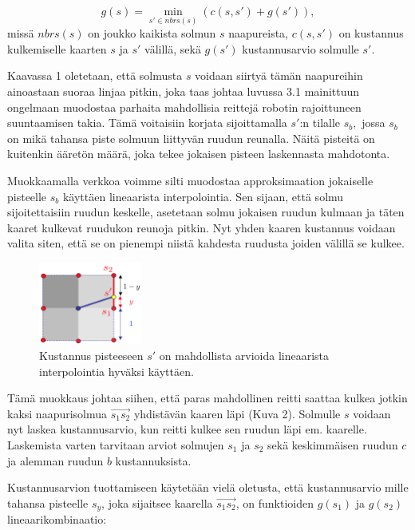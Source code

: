 \documentclass[finnish]{tktltiki2}
\theoremstyle{definition}
\theoremstyle{remark}
\begin{document}
\begin{equation}
	g(s) = \min_{s'\in nbrs(s)} (c(s, s') +g(s')),
\end{equation}
missä \(nbrs(s)\) on joukko kaikista solmun \(s\) naapureista, \(c(s,s')\) on kustannus kulkemiselle kaarten \(s\) ja \(s'\) välillä, sekä \(g(s')\) kustannusarvio solmulle \(s'\).

Kaavassa 1 oletetaan, että solmusta \(s\) voidaan siirtyä tämän naapureihin ainoastaan suoraa linjaa pitkin, joka taas johtaa luvussa 3.1 mainittuun ongelmaan muodostaa parhaita mahdollisia reittejä robotin rajoittuneen suuntaamisen takia. Tämä voitaisiin korjata sijoittamalla \(s'\):n tilalle \(s_b,\) jossa \(s_b\) on mikä tahansa piste solmuun liittyvän ruudun reunalla. Näitä pisteitä on kuitenkin ääretön määrä, joka tekee jokaisen pisteen laskennasta mahdotonta.

Muokkaamalla verkkoa voimme silti muodostaa approksimaation jokaiselle pisteelle \(s_b\) käyttäen lineaarista interpolointia. Sen sijaan, että solmu sijoitettaisiin ruudun keskelle, asetetaan solmu jokaisen ruudun kulmaan ja täten kaaret kulkevat ruudukon reunoja pitkin. Nyt yhden kaaren kustannus voidaan valita siten, että se on pienempi niistä kahdesta ruudusta joiden välillä se kulkee.

\begin{figure}[H]
	\caption{Kustannus pisteeseen $s'$ on mahdollista arvioida lineaarista interpolointia hyväksi käyttäen. \cite{marsjuttuja}}
	\centering
		\includegraphics[width=0.3\textwidth]{new_grid}
\end{figure}
Tämä muokkaus johtaa siihen, että paras mahdollinen reitti saattaa kulkea jotkin kaksi naapurisolmua $\overrightarrow{s_1s_2}$ yhdistävän kaaren läpi (Kuva 2). Solmulle \(s\) voidaan nyt laskea kustannusarvio, kun reitti kulkee sen ruudun läpi em. kaarelle. Laskemista varten tarvitaan arviot solmujen \(s_1\) ja \(s_2\) sekä keskimmäisen ruudun \(c\) ja alemman ruudun \(b\) kustannuksista.

Kustannusarvion tuottamiseen käytetään vielä oletusta, että kustannusarvio mille tahansa pisteelle \(s_y\), joka sijaitsee kaarella $\overrightarrow{s_1s_2}$, on funktioiden \(g(s_1)\) ja \(g(s_2)\) lineaarikombinaatio:
\end{document}
